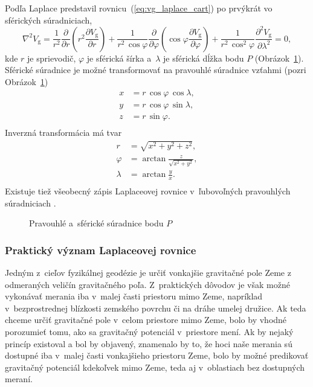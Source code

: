 \documentclass[a4paper,12pt]{book}
\newcommand{\gidx}{\mathrm g}
\begin{document}
Podľa \textcite{MacMillan1930} Laplace predstavil 
rovnicu~(\ref{eq:vg_laplace_cart}) po prvýkrát vo sférických súradniciach,
%
\begin{equation}
\label{eq:vg_laplace_sph}
\nabla^2 V_\gidx = \frac{1}{r^2} \frac{\partial}{\partial r} \left( r^2
\frac{\partial V_\gidx}{\partial r} \right) + \frac{1}{r^2 \, \cos\varphi}
\frac{\partial}{\partial \varphi} \left( \cos\varphi \frac{\partial
V_\gidx}{\partial \varphi} \right) + \frac{1}{r^2 \,
\cos^2\varphi}\frac{\partial^2 V_\gidx}{\partial \lambda^2} = 0{,}
\end{equation}
%
kde $r$ je sprievodič, $\varphi$ je sférická šírka a~$\lambda$ je sférická
dĺžka bodu $P$ (Obrázok~\ref{fig:cart_sph}).  Sférické súradnice je možné
transformovať na pravouhlé súradnice vzťahmi (pozri Obrázok~\ref{fig:cart_sph})
%
\begin{equation}
\label{eq:sph2cart}
\begin{split}
x &= r \, \cos\varphi \, \cos\lambda{,}\\
y &= r \, \cos\varphi \, \sin\lambda{,}\\
z &= r \, \sin\varphi{.}\\
\end{split}
\end{equation}
%
Inverzná transformácia má tvar
%
\begin{equation}
\label{eq:cart2sph}
\begin{split}
r &= \sqrt{x^2 + y^2 + z^2}{,}\\
\varphi &= \arctan \frac{z}{\sqrt{x^2 + y^2}}{,}\\
\lambda &= \arctan \frac{y}{x}{.}\\
\end{split}
\end{equation}
%
Existuje tiež všeobecný zápis Laplaceovej rovnice v~ľubovoľných pravouhlých
súradniciach \parencite[pozri 
napríklad][]{MoritzPhysicalGeodesy,SansoGeoidDetermination}.

\begin{figure}
\centering

\caption{Pravouhlé a~sférické súradnice bodu $P$}
\label{fig:cart_sph}
\end{figure}


\subsubsection{Praktický význam Laplaceovej rovnice}

Jedným z~cieľov fyzikálnej geodézie je určiť vonkajšie gravitačné pole Zeme 
z odmeraných veličín gravitačného poľa.  Z~praktických dôvodov je však možné 
vykonávať merania iba v~malej časti priestoru mimo Zeme, napríklad 
v~bezprostrednej blízkosti zemského povrchu či na dráhe umelej družice.  Ak 
teda chceme určiť gravitačné pole v~celom priestore mimo Zeme, bolo by vhodné 
porozumieť tomu, ako sa gravitačný potenciál v~priestore mení.  Ak by nejaký 
princíp existoval a bol by objavený, znamenalo by to, že hoci naše merania sú 
dostupné iba v~malej časti vonkajšieho priestoru Zeme, bolo by možné predikovať 
gravitačný potenciál kdekoľvek mimo Zeme, teda aj v~oblastiach bez dostupných 
meraní.
\end{document}
